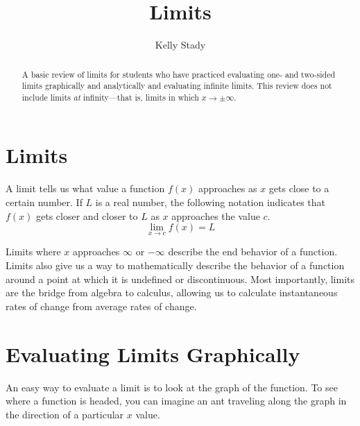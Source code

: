 \documentclass{ximera}
\title{Limits}   %
\author{Kelly Stady}
\begin{document}
\begin{abstract}
    A basic review of limits for students who have practiced evaluating one- and two-sided limits graphically and analytically and evaluating
    infinite limits.  This review does not include limits \textit{at} infinity---that is, limits in which $x \to \pm \infty.$

\end{abstract}
\maketitle
\label{xim:Limits}  %



\section*{Limits}

A limit tells us what value a function $f(x)$ approaches as $x$ gets close to a certain number.  If $L$ is a real number, the following notation
indicates that $f(x)$ gets closer and closer to $L$ as $x$ approaches the value $c.$
\[ \lim_{x \to c} f(x) = L \]

Limits where $x$ approaches $\infty$ or $-\infty$
describe the end behavior of a function.  Limits also give us a way to mathematically describe the behavior of a function around a point at
which it is undefined or discontinuous.  Most importantly, limits are the bridge from algebra to calculus, allowing us to calculate instantaneous
rates of change from average rates of change.

\section*{Evaluating Limits Graphically}

An easy way to evaluate a limit is to look at the graph of the function.  To see where a function is headed, you can imagine an ant
traveling along the graph in the direction of a particular $x$ value.
\end{document}
